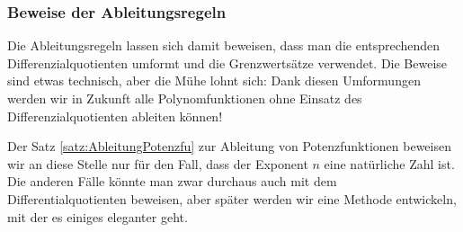 \clearpage
\subsubsection*{Beweise der Ableitungsregeln}

Die Ableitungsregeln lassen sich damit beweisen, dass man die entsprechenden Differenzialquotienten umformt und die Grenzwertsätze verwendet. Die Beweise sind etwas technisch, aber die Mühe lohnt sich: Dank diesen Umformungen werden wir in Zukunft alle Polynomfunktionen ohne Einsatz des Differenzialquotienten ableiten können!

Der Satz \ref*{satz:AbleitungPotenzfu} zur Ableitung von Potenzfunktionen beweisen wir an diese Stelle nur für den Fall, dass der Exponent $n$ eine natürliche Zahl ist. Die anderen Fälle könnte man zwar durchaus auch mit dem Differentialquotienten beweisen, aber später werden wir eine Methode entwickeln, mit der es einiges eleganter geht.

